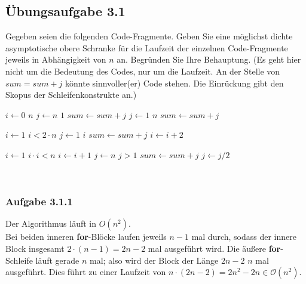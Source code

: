 \documentclass{article}
\begin{document}
\subsection{Übungsaufgabe 3.1}
\begin{flushright}
\begin{Large}
[~~~~\string| ~~3~]
\end{Large}
\end{flushright}
Gegeben seien die folgenden Code-Fragmente.
Geben Sie eine möglichst dichte asymptotische obere Schranke für die Laufzeit der einzelnen Code-Fragmente jeweils in Abhängigkeit von $n$ an.
Begründen Sie Ihre Behauptung.
(Es geht hier nicht um die Bedeutung des Codes, nur um die Laufzeit.
An der Stelle von $sum = sum + j$ könnte sinnvoller(er) Code stehen.
Die Einrückung gibt den Skopus der Schleifenkonstrukte an.) \\
\vspace{0.3cm}
\begin{minipage}[t]{0.32\textwidth}
	\begin{codebox}
		\li \For $i \gets 0$ \To $n$
		\Indentmore
			\li \For $j \gets n$ \Downto $1$
			\Indentmore
				\li $sum \gets sum+j$
			\End
			\li \For $j \gets 1$ \To $n$
			\Indentmore
				\li $sum \gets sum+j$
			\End
		\End
	\end{codebox}
\end{minipage}
\begin{minipage}[t]{0.32\textwidth}
	\begin{codebox}
		\Procname{\textsc{Algo2()}}
		\li $i \gets 1$
		\li \While $i < 2 \cdot n$
		\Indentmore
			\li \For $j \gets 1$ \To $i$
			\Indentmore
				\li $sum \gets sum+j$
			\End
			\li $i \gets i+2$
		\End
	\end{codebox}
\end{minipage}
\begin{minipage}[t]{0.32\textwidth}
	\begin{codebox}
		\Procname{\textsc{Algo3()}}
		\li $i \gets 1$
		\li \While $i \cdot i < n$
		\Indentmore
			\li $i \gets i+1$
			\li $j \gets n$
			\li \While $j > 1$
			\Indentmore
				\li $sum \gets sum+j$
				\li $j \gets j/2$
			\End
		\End
	\end{codebox}
\end{minipage}
\vspace{1cm}\-\\
\subsubsection{Aufgabe 3.1.1}
Der Algorithmus läuft in $O(n^2)$.\\
Bei beiden inneren \textbf{for}-Blöcke laufen jeweils $n-1$ mal durch, sodass der innere Block insgesamt $2 \cdot (n-1)=2n-2$ mal ausgeführt wird.
Die äußere \textbf{for}-Schleife läuft gerade $n$ mal; also wird der Block der Länge $2n-2$ $n$ mal ausgeführt.
Dies führt zu einer Laufzeit von $n \cdot (2n-2)=2n^2-2n \in \mathcal{O}(n^2)$.
\end{document}
